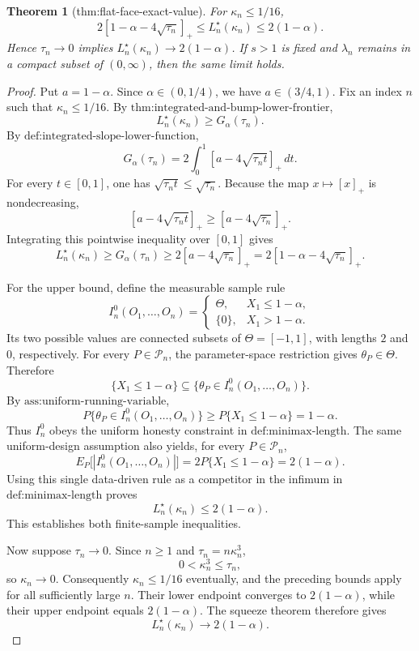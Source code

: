 \documentclass{article}
\newtheorem{theorem}{Theorem}
\begin{document}
\begin{theorem}[thm:flat-face-exact-value]\label{thm:flat-face-exact-value}
For \(\kappa_n\le1/16\), \[2[1-\alpha-4\sqrt{\tau_n}]_+\le L_n^\star(\kappa_n)\le2(1-\alpha).\] Hence \(\tau_n\to0\) implies \(L_n^\star(\kappa_n)\to2(1-\alpha)\). If \(s>1\) is fixed and \(\lambda_n\) remains in a compact subset of \((0,\infty)\), then the same limit holds.
\end{theorem}
\begin{proof}
Put \(a=1-\alpha\).  Since \(\alpha\in(0,1/4)\), we have
\(a\in(3/4,1)\).  Fix an index \(n\) such that
\(\kappa_n\le 1/16\).  By
\(\text{thm:integrated-and-bump-lower-frontier}\),
\[
 L_n^\star(\kappa_n)\ge G_\alpha(\tau_n).
\]
By \(\text{def:integrated-slope-lower-function}\),
\[
 G_\alpha(\tau_n)
 =2\int_0^1 [a-4\sqrt{\tau_n t}]_+\,dt.
\]
For every \(t\in[0,1]\), one has
\(\sqrt{\tau_n t}\le \sqrt{\tau_n}\).  Because the map
\(x\mapsto[x]_+\) is nondecreasing,
\[
 [a-4\sqrt{\tau_n t}]_+
 \ge [a-4\sqrt{\tau_n}]_+.
\]
Integrating this pointwise inequality over \([0,1]\) gives
\[
 L_n^\star(\kappa_n)
 \ge G_\alpha(\tau_n)
 \ge 2[a-4\sqrt{\tau_n}]_+
 =2[1-\alpha-4\sqrt{\tau_n}]_+.
\]

For the upper bound, define the measurable sample rule
\[
 I_n^0(O_1,\ldots,O_n)
 =
 \begin{cases}
   \Theta,& X_1\le 1-\alpha,\\
   \{0\},& X_1>1-\alpha.
 \end{cases}
\]
Its two possible values are connected subsets of
\(\Theta=[-1,1]\), with lengths \(2\) and \(0\), respectively.
For every \(P\in\mathcal P_n\), the parameter-space restriction gives
\(\theta_P\in\Theta\).  Therefore
\[
 \{X_1\le1-\alpha\}
 \subseteq
 \{\theta_P\in I_n^0(O_1,\ldots,O_n)\}.
\]
By \(\text{ass:uniform-running-variable}\),
\[
 P\{\theta_P\in I_n^0(O_1,\ldots,O_n)\}
 \ge P\{X_1\le1-\alpha\}
 =1-\alpha.
\]
Thus \(I_n^0\) obeys the uniform honesty constraint in
\(\text{def:minimax-length}\).  The same uniform-design assumption
also yields, for every \(P\in\mathcal P_n\),
\[
 E_P\bigl[|I_n^0(O_1,\ldots,O_n)|\bigr]
 =2P\{X_1\le1-\alpha\}
 =2(1-\alpha).
\]
Using this single data-driven rule as a competitor in the infimum in
\(\text{def:minimax-length}\) proves
\[
 L_n^\star(\kappa_n)\le2(1-\alpha).
\]
This establishes both finite-sample inequalities.

Now suppose \(\tau_n\to0\).  Since \(n\ge1\) and
\(\tau_n=n\kappa_n^3\),
\[
 0<\kappa_n^3\le\tau_n,
\]
so \(\kappa_n\to0\).  Consequently \(\kappa_n\le1/16\)
eventually, and the preceding bounds apply for all sufficiently large
\(n\).  Their lower endpoint converges to \(2(1-\alpha)\), while their
upper endpoint equals \(2(1-\alpha)\).  The squeeze theorem therefore
gives
\[
 L_n^\star(\kappa_n)\longrightarrow2(1-\alpha).
\]


\end{proof}
\end{document}

